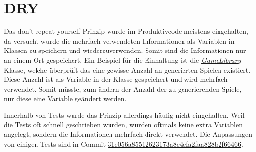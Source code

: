 \section{DRY}
Das \glqq don't repeat yourself\grqq{} Prinzip wurde im Produktivcode meistens eingehalten, da versucht wurde die mehrfach verwendeten Informationen als Variablen in Klassen zu speichern und wiederzuverwenden. Somit sind die Informationen nur an einem Ort gespeichert. Ein Beispiel für die Einhaltung ist die \href{https://github.com/EinToni/Wortfinder/blob/main/Wortfinder/GameLibrary.cs}{\textit{GameLibrary}} Klasse, welche überprüft das eine gewisse Anzahl an generierten Spielen existiert. Diese Anzahl ist als Variable in der Klasse gespeichert und wird mehrfach verwendet. Somit müsste, zum ändern der Anzahl der zu generierenden Spiele, nur diese eine Variable geändert werden.


Innerhalb von Tests wurde das Prinzip allerdings häufig nicht eingehalten. Weil die Tests oft schnell geschrieben wurden, wurden oftmals keine extra Variablen angelegt, sondern die Informationen mehrfach direkt verwendet. Die Anpassungen von einigen Tests sind in Commit \href{https://github.com/EinToni/Wortfinder/commit/31e056a85512623173a8e4efa2faa828b2f66466}{31e056a85512623173a8e4efa2faa828b2f66466}.
\endinput